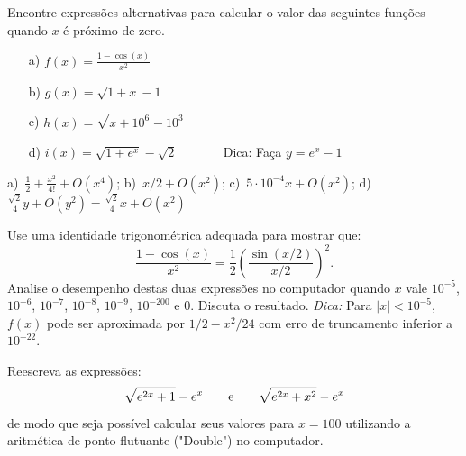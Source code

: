 \begin{exer} Encontre expressões alternativas para calcular o valor das seguintes funções quando $x$ é próximo de zero.
\begin{itemize}
\item[a)] $f(x)=\frac{1-\cos(x)}{x^2}$
\item[b)] $g(x)=\sqrt{1+x}-1$
\item[c)] $h(x)=\sqrt{x+10^6}-10^3$
\item[d)] $i(x)=\sqrt{1+e^{x}}-\sqrt{2}$ ~~~~~~ Dica: Faça $y=e^{x}-1$
\end{itemize}
\end{exer}
\begin{resp}
  
    a)~$\frac{1}{2}+\frac{x^2}{4!}+O(x^4)$; b)~$x/2+O(x^2)$; c)~$5\cdot 10^{-4}x+O(x^2)$; d)~$\frac{\sqrt{2}}{4}y+O(y^{2})=\frac{\sqrt{2}}{4}x+O(x^2)$
  
\end{resp}

\begin{exer} Use uma identidade trigonométrica adequada para mostrar que:
  \begin{equation*}
    \frac{1-\cos(x)}{x^2}= \frac{1}{2} \left(\frac{\sin(x/2)}{x/2}\right)^2.
  \end{equation*}
Analise o desempenho destas duas expressões no computador quando $x$ vale $10^{-5}$, $10^{-6}$, $10^{-7}$, $10^{-8}$, $10^{-9}$, $10^{-200}$ e $0$. Discuta o resultado.
\emph{Dica:} Para $|x|<10^{-5}$, $f(x)$ pode ser aproximada por $1/2-x^2/24$ com erro de truncamento inferior a $10^{-22}$.
\end{exer}



\begin{exer} Reescreva as expressões:
  $$\sqrt{e^{2x}+1}-e^x \qquad\hbox{e}\qquad \sqrt{e^{2x}+x^2}-e^x $$
  de modo que seja possível calcular seus valores para $x=100$ utilizando a aritmética de ponto flutuante ("Double") no computador.
\end{exer}

